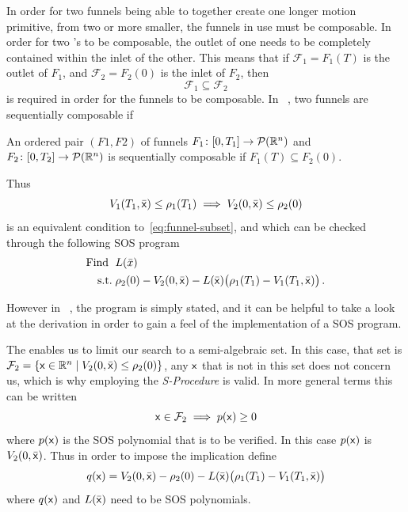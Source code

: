 In order for two funnels being able to together create one longer motion
primitive, from two or more smaller, the funnels in use must be composable. In
order for two \funnel's to be composable, the outlet of one \funnel{} needs to
be completely contained within the inlet of the other. This means that if
\(\mathcal{F}_1 = F_1(T)\) is the outlet of \funnel{} \(F_1\), and
\(\mathcal{F}_2 = F_2(0)\) is the inlet of \(F_2\), then
\begin{equation}
  \label{eq:funnel-subset}
  \mathcal{F}_1 \subseteq \mathcal{F}_2
\end{equation}
is required in order for the funnels to be composable. In
\citeauthor{majumdarFunnelLibrariesRealtime2017}~\cite[47]{majumdarFunnelLibrariesRealtime2017},
two funnels are sequentially composable if
\begin{definition}
  \label{def:funnel-composition}
  An ordered pair \((F1, F2)\) of funnels \(F_1 \colon [0,T_1] \rightarrow
  \mathcal{P}(\mathbb{R}^n)\) and \(F_2 \colon [0,T_2] \rightarrow \mathcal{P}(\mathbb{R}^n)\)
  is sequentially composable if \(F_1(T) \subseteq F_2(0)\).
\end{definition}
Thus
\begin{equation}
  V_1(T_1,\bar{{\mathbf{\mathsf{x}}}}) \leq \rho_1(T_1) \implies V_2(0,\bar{{\mathbf{\mathsf{x}}}}) \leq
  \rho_2(0)
\end{equation}
is an equivalent condition to~\cref{eq:funnel-subset}, and which can be checked
through the following \ac{SOS} program
\begin{align}
  \text{Find } \; &L(\bar{x})  \\
  \text{s.t.} \; &\rho_2(0) - V_2( 0,\bar{{\mathbf{\mathsf{x}}}}) - L(\bar{{\mathbf{\mathsf{x}}}})
                  \bigl( \rho_1(T_1) - V_1(T_1,\bar{{\mathbf{\mathsf{x}}}}) \bigr) \, . \nonumber
\end{align}

However in
\citeauthor{majumdarFunnelLibrariesRealtime2017}~\cite{majumdarFunnelLibrariesRealtime2017},
the program is simply stated, and it can be helpful to take a look at the
derivation in order to gain a feel of the implementation of a \ac{SOS} program.

The  enables us to limit our search to a semi-algebraic
set. In this case, that set is \(\mathcal{F}_2 = \lbrace{\mathbf{\mathsf{x}}} \in \mathbb{R}^n \mid
  V_2(0,\bar{{\mathbf{\mathsf{x}}}}) \leq \rho_2(0)\rbrace\), any \({\mathbf{\mathsf{x}}}\) that is not in this
set does not concern us, which is why employing the \textit{S-Procedure} is
valid. In more general terms this can be written
\[
  {\mathbf{\mathsf{x}}} \in \mathcal{F}_2 \implies p({\mathbf{\mathsf{x}}}) \geq 0
\]
where \(p({\mathbf{\mathsf{x}}})\) is the \ac{SOS} polynomial that is to be verified. In this
case \(p({\mathbf{\mathsf{x}}})\) is \(V_2(0,\bar{{\mathbf{\mathsf{x}}}})\). Thus in order to impose the
implication define
\[
  q({\mathbf{\mathsf{x}}}) = V_2(0,\bar{{\mathbf{\mathsf{x}}}}) - \rho_2(0) - L(\bar{{\mathbf{\mathsf{x}}}}) \bigl(
    \rho_1(T_1) - V_1(T_1,\bar{{\mathbf{\mathsf{x}}}}) \bigr)
\]
where \(q({\mathbf{\mathsf{x}}})\) and \(L(\bar{{\mathbf{\mathsf{x}}}})\) need to be SOS polynomials.

